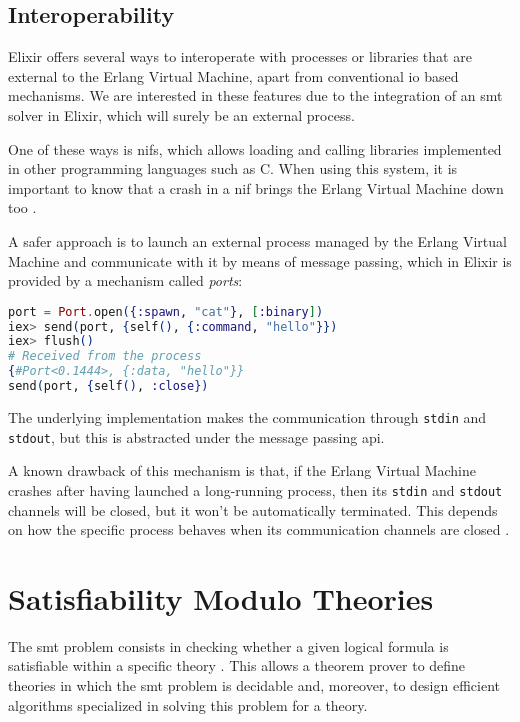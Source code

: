 \subsection{Interoperability}

Elixir offers several ways to interoperate with processes or libraries that are
external to the Erlang Virtual Machine, apart from conventional \gls{io} based
mechanisms. We are interested in these features due to the integration of an
\acrshort{smt} solver in Elixir, which will surely be an external process.

One of these ways is \gls{nif}s, which allows loading and calling libraries
implemented in other programming languages such as C. When using this system, it
is important to know that a crash in a \gls{nif} brings the Erlang Virtual 
Machine down too \citep{ErlangDocs}.

A safer approach is to launch an external process managed by the Erlang Virtual
Machine and communicate with it by means of message passing, which in Elixir is
provided by a mechanism called \textit{ports}:

\begin{lstlisting}[language=elixir,numbers=none,frame=none]
port = Port.open({:spawn, "cat"}, [:binary])
iex> send(port, {self(), {:command, "hello"}})
iex> flush()
# Received from the process
{#Port<0.1444>, {:data, "hello"}} 
send(port, {self(), :close})
\end{lstlisting}

The underlying implementation makes the communication through \verb|stdin| and 
\verb|stdout|, but this is abstracted under the message passing \gls{api}.

A known drawback of this mechanism is that, if the Erlang Virtual Machine
crashes after having launched a long-running process, then its \verb|stdin| and
\verb|stdout| channels will be closed, but it won't be automatically terminated.
This depends on how the specific process behaves when its communication channels
are closed \citep{ElixirDocs}.

\section{Satisfiability Modulo Theories}

The \gls{smt} problem consists in checking whether a given logical formula is
satisfiable within a specific theory \citep{smtLibStandard}. This allows a 
theorem prover to define theories in which the \gls{smt} problem is decidable
and, moreover, to design efficient algorithms specialized in solving this
problem for a theory.


